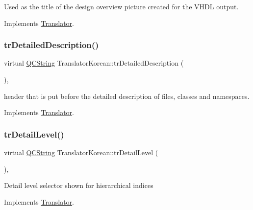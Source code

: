 Used as the title of the design overview picture created for the V\+H\+DL output. 

Implements \mbox{\hyperlink{class_translator}{Translator}}.

\mbox{\label{class_translator_korean_a363daf2b9ae9fa4719ffc0194b23872c}} 
\subsubsection{\texorpdfstring{trDetailedDescription()}{trDetailedDescription()}}
{\footnotesize\ttfamily virtual \mbox{\hyperlink{class_q_c_string}{Q\+C\+String}} Translator\+Korean\+::tr\+Detailed\+Description (\begin{DoxyParamCaption}{ }\end{DoxyParamCaption})\hspace{0.3cm}{\ttfamily [inline]}, {\ttfamily [virtual]}}

header that is put before the detailed description of files, classes and namespaces. 

Implements \mbox{\hyperlink{class_translator}{Translator}}.

\mbox{\label{class_translator_korean_a136e6478302ac1b2fee739f4f4053d56}} 
\subsubsection{\texorpdfstring{trDetailLevel()}{trDetailLevel()}}
{\footnotesize\ttfamily virtual \mbox{\hyperlink{class_q_c_string}{Q\+C\+String}} Translator\+Korean\+::tr\+Detail\+Level (\begin{DoxyParamCaption}{ }\end{DoxyParamCaption})\hspace{0.3cm}{\ttfamily [inline]}, {\ttfamily [virtual]}}

Detail level selector shown for hierarchical indices 

Implements \mbox{\hyperlink{class_translator}{Translator}}.

\mbox{\label{class_translator_korean_a86717f83e00ae8877bf9bae2b41772dd}} 
